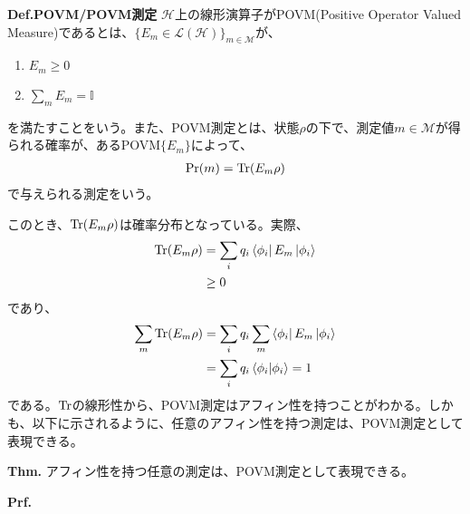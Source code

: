 \documentclass[a4paper,11pt]{jsarticle}
\numberwithin{equation}{section}
\begin{document}
\begin{itembox}[l]{\textbf{Def.POVM/POVM測定}}
    $\mathcal{H}$上の線形演算子がPOVM(Positive Operator Valued Measure)であるとは、$\{E_m \in \mathcal{L}(\mathcal{H})\}_{m \in \mathcal{M}}$が、
    \begin{enumerate}
        \item $E_m \geq 0$
        \item $\sum_m E_m = \mathbb{I}$
    \end{enumerate}
    を満たすことをいう。また、POVM測定とは、状態$\rho$の下で、測定値$m \in \mathcal{M}$が得られる確率が、あるPOVM$\{E_m\}$によって、
    \begin{align}
        \Pr(m) = \Tr(E_m\rho)
    \end{align}
    で与えられる測定をいう。
\end{itembox}
このとき、$\Tr(E_m\rho)$は確率分布となっている。実際、
\begin{align}
    \Tr(E_m\rho) &= \sum_{i}q_i\bra{\phi_i}E_m\ket{\phi_i}\\
    &\geq 0
\end{align}
であり、
\begin{align}
    \sum_m \Tr(E_m\rho) &= \sum_i q_i\sum_m \bra{\phi_i}E_m\ket{\phi_i}\\
    &= \sum_i q_i\braket{\phi_i}{\phi_i} = 1
\end{align}
である。$\Tr$の線形性から、POVM測定はアフィン性を持つことがわかる。しかも、以下に示されるように、任意のアフィン性を持つ測定は、POVM測定として表現できる。

\begin{itembox}[l]{\textbf{Thm.}}
    アフィン性を持つ任意の測定は、POVM測定として表現できる。
\end{itembox}
\textbf{Prf.}\\
\end{document}
